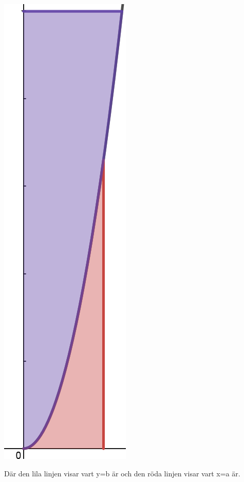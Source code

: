 \documentclass[a4paper,12pt]{article}
\begin{document}
\begin{enumerate}
    \begin{center}
        \includegraphics[scale=0.4]{Figur 6.png}
    \end{center}

    Där den lila linjen visar vart y=b är och den röda linjen
    visar vart x=a är. 

\end{enumerate}
\end{document}
